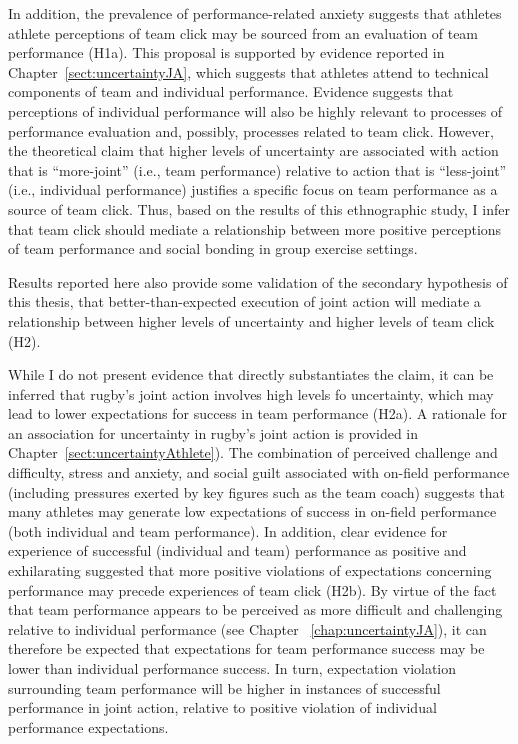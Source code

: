 \begin{CJK}{UTF8}{gbsn}
In addition, the prevalence of performance-related anxiety suggests that athletes athlete perceptions of team click may be sourced from an evaluation of team performance (H1a).  This proposal is supported by evidence reported in Chapter~\ref{sect:uncertaintyJA}, which suggests that athletes attend to technical components of team and individual performance. Evidence suggests that perceptions of individual performance will also be highly relevant to processes of performance evaluation and, possibly, processes related to team click.  However, the theoretical claim that higher levels of uncertainty are associated with action that is ``more-joint'' (i.e., team performance) relative to action that is ``less-joint'' (i.e., individual performance) justifies a specific focus on team performance as a source of team click. Thus, based on the results of this ethnographic study, I infer that team click should mediate a relationship between more positive perceptions of team performance and social bonding in group exercise settings.

Results reported here also provide some validation of the secondary hypothesis of this thesis, that better-than-expected execution of joint action will mediate a relationship between higher levels of uncertainty and higher levels of team click (H2).

While I do not present evidence that directly substantiates the claim, it can be inferred that rugby's joint action involves high levels fo uncertainty, which may lead to lower expectations for success in team performance (H2a).  A rationale for an association for uncertainty in rugby's joint action is provided in Chapter~\ref{sect:uncertaintyAthlete}).  The combination of perceived challenge and difficulty, stress and anxiety, and social guilt associated with on-field performance (including pressures exerted by key figures such as the team coach) suggests that many athletes may generate low expectations of success in on-field performance (both individual and team performance).   In addition, clear evidence for experience of successful (individual and team) performance as positive and exhilarating suggested that more positive violations of expectations concerning performance may precede experiences of team click (H2b).  By virtue of the fact that team performance appears to be perceived as more difficult and challenging relative to individual performance (see Chapter ~\ref{chap:uncertaintyJA}), it can therefore be expected that expectations for team performance success may be lower than individual performance success. In turn, expectation violation surrounding team performance will be higher in instances of successful performance in joint action, relative to positive violation of individual performance expectations.


\end{CJK}

